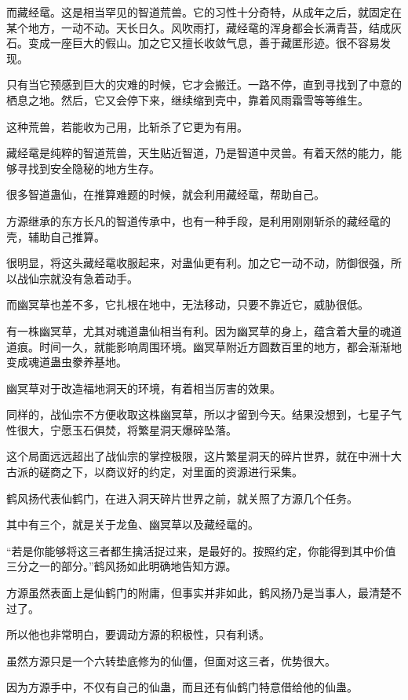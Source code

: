 \begin{this_body}
而藏经鼋。这是相当罕见的智道荒兽。它的习性十分奇特，从成年之后，就固定在某个地方，一动不动。天长日久。风吹雨打，藏经鼋的浑身都会长满青苔，结成灰石。变成一座巨大的假山。加之它又擅长收敛气息，善于藏匿形迹。很不容易发现。

只有当它预感到巨大的灾难的时候，它才会搬迁。一路不停，直到寻找到了中意的栖息之地。然后，它又会停下来，继续缩到壳中，靠着风雨霜雪等等维生。

这种荒兽，若能收为己用，比斩杀了它更为有用。

藏经鼋是纯粹的智道荒兽，天生贴近智道，乃是智道中灵兽。有着天然的能力，能够寻找到安全隐秘的地方生存。

很多智道蛊仙，在推算难题的时候，就会利用藏经鼋，帮助自己。

方源继承的东方长凡的智道传承中，也有一种手段，是利用刚刚斩杀的藏经鼋的壳，辅助自己推算。

很明显，将这头藏经鼋收服起来，对蛊仙更有利。加之它一动不动，防御很强，所以战仙宗就没有急着动手。

而幽冥草也差不多，它扎根在地中，无法移动，只要不靠近它，威胁很低。

有一株幽冥草，尤其对魂道蛊仙相当有利。因为幽冥草的身上，蕴含着大量的魂道道痕。时间一久，就能影响周围环境。幽冥草附近方圆数百里的地方，都会渐渐地变成魂道蛊虫豢养基地。

幽冥草对于改造福地洞天的环境，有着相当厉害的效果。

同样的，战仙宗不方便收取这株幽冥草，所以才留到今天。结果没想到，七星子气性很大，宁愿玉石俱焚，将繁星洞天爆碎坠落。

这个局面远远超出了战仙宗的掌控极限，这片繁星洞天的碎片世界，就在中洲十大古派的磋商之下，以商议好的约定，对里面的资源进行采集。

鹤风扬代表仙鹤门，在进入洞天碎片世界之前，就关照了方源几个任务。

其中有三个，就是关于龙鱼、幽冥草以及藏经鼋的。

“若是你能够将这三者都生擒活捉过来，是最好的。按照约定，你能得到其中价值三分之一的部分。”鹤风扬如此明确地告知方源。

方源虽然表面上是仙鹤门的附庸，但事实并非如此，鹤风扬乃是当事人，最清楚不过了。

所以他也非常明白，要调动方源的积极性，只有利诱。

虽然方源只是一个六转垫底修为的仙僵，但面对这三者，优势很大。

因为方源手中，不仅有自己的仙蛊，而且还有仙鹤门特意借给他的仙蛊。


\end{this_body}
